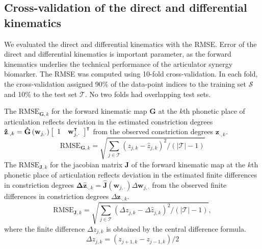 \documentclass[preprint]{JASAnew}
\begin{document}
\subsection{Cross-validation of the direct and differential kinematics}

We evaluated the direct and differential kinematics with the RMSE.
%
Error of the direct and differential kinematics is important parameter, as the forward kinematics underlies the technical performance of the articulator synergy biomarker.
%
The RMSE was computed using \num{10}-fold cross-validation. 
%
In each fold, the cross-validation assigned 90\% of the data-point indices to the training set $\mathcal{S}$ and 10\% to the test set $\mathcal{T}$.
%
No two folds had overlapping test sets. 


The $\mathrm{RMSE}_{\mathbf{G},k}$ for the forward kinematic map $\mathbf{G}$ at the $k$th phonetic place of articulation reflects deviation in the estimated constriction degrees $\mathbf{\hat{z}}_{\cdot,k} = \mathbf{\hat{G}}\left( \mathbf{w}_{j,\cdot} \right) \left[ \begin{array}{c c} 1 & \mathbf{w}_{j,\cdot}^\intercal \end{array} \right]^\intercal$ from the observed constriction degrees $\mathbf{z}_{\cdot,k}$.
%
\begin{equation}
\mathrm{RMSE}_{\mathbf{G},k} = \sqrt{ \sum_{j\in\mathcal{T}} \left( z_{j,k} - \hat{z}_{j,k} \right)^2 \bigg/ \left( \lvert \mathcal{T} \rvert - 1 \right) }
\end{equation}
The $\mathrm{RMSE}_{\mathbf{J},k}$ for the jacobian matrix $\mathbf{J}$ of the forward kinematic map at the $k$th phonetic place of articulation reflects deviation in the estimated finite differences in constriction degrees $\mathbf{\Delta \hat{z}}_{\cdot,k} = \mathbf{\hat{J}}\left( \mathbf{w}_{j,\cdot} \right) \Delta \mathbf{w}_{j,\cdot}$ from the observed finite differences in constriction degrees $\Delta \mathbf{z}_{\cdot,k}$.
%
\begin{equation}
\mathrm{RMSE}_{\mathbf{J},k} = \sqrt{ \sum_{j\in\mathcal{T}} \left( \Delta z_{j,k} - \Delta \hat{z}_{j,k} \right)^2 \bigg/ \left( \lvert \mathcal{T} \rvert - 1 \right) },
\end{equation}
%
where the finite difference $\Delta z_{j,k}$ is obtained by the central difference formula.
%
\begin{equation}
\Delta z_{j,k} = \left( z_{j+1,k} - z_{j-1,k} \right) / 2
\end{equation}
\end{document}
